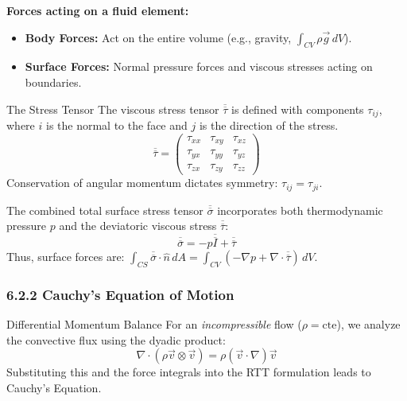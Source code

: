 \textbf{Forces acting on a fluid element:}
\begin{itemize}
    \item \textbf{Body Forces:} Act on the entire volume (e.g., gravity, $\int_{CV} \rho \vec{g} \, dV$).
    \item \textbf{Surface Forces:} Normal pressure forces and viscous stresses acting on boundaries.
\end{itemize}

\begin{defbox}{The Stress Tensor}
The viscous stress tensor $\overline{\overline{\tau}}$ is defined with components $\tau_{ij}$, where $i$ is the normal to the face and $j$ is the direction of the stress.
\begin{equation*}
    \overline{\overline{\tau}} = \begin{pmatrix}
    \tau_{xx} & \tau_{xy} & \tau_{xz} \\
    \tau_{yx} & \tau_{yy} & \tau_{yz} \\
    \tau_{zx} & \tau_{zy} & \tau_{zz}
    \end{pmatrix}
\end{equation*}
Conservation of angular momentum dictates symmetry: $\tau_{ij} = \tau_{ji}$.
\end{defbox}

\begin{conceptbox}
The combined total surface stress tensor $\overline{\overline{\sigma}}$ incorporates both thermodynamic pressure $p$ and the deviatoric viscous stress $\overline{\overline{\tau}}$:
\begin{equation*}
    \overline{\overline{\sigma}} = -p\overline{\overline{I}} + \overline{\overline{\tau}}
\end{equation*}
Thus, surface forces are: $\displaystyle \int_{CS} \overline{\overline{\sigma}} \cdot \hat{n} \, dA = \int_{CV} (-\nabla p + \nabla \cdot \overline{\overline{\tau}}) \, dV$.
\end{conceptbox}

\subsubsection{6.2.2 Cauchy's Equation of Motion}
\begin{thmbox}{Differential Momentum Balance}
For an \textit{incompressible} flow ($\rho = \text{cte}$), we analyze the convective flux using the dyadic product:
\begin{equation*}
    \nabla \cdot (\rho \vec{v} \otimes \vec{v}) = \rho (\vec{v} \cdot \nabla) \vec{v}
\end{equation*}
Substituting this and the force integrals into the RTT formulation leads to Cauchy's Equation.
\end{thmbox}

